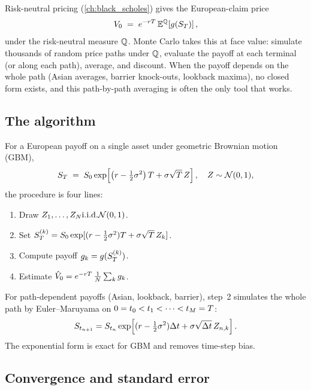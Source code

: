 Risk-neutral pricing (\cref{ch:black_scholes}) gives the European-claim
price
\begin{equation}
\label{eq:rn_pricing}
  V_0 \;=\; e^{-r T}\, \mathbb{E}^{\mathbb{Q}}\!\left[ g(S_T) \right],
\end{equation}
under the risk-neutral measure $\mathbb{Q}$.  Monte Carlo takes this at
face value: simulate thousands of random price paths under $\mathbb{Q}$,
evaluate the payoff at each terminal (or along each path), average,
and discount.  When the payoff depends on the whole path (Asian
averages, barrier knock-outs, lookback maxima), no closed form
exists, and this path-by-path averaging is often the only tool that
works.

\subsection{The algorithm}

For a European payoff on a single asset under geometric Brownian
motion (GBM),
\begin{equation}
  S_T \;=\; S_0 \exp\!\left[
    \left(r - \tfrac12 \sigma^2\right)T
    + \sigma \sqrt{T}\, Z \right],
  \quad Z \sim \mathcal{N}(0,1),
\end{equation}
the procedure is four lines:
\begin{enumerate}
  \item Draw $Z_1, \ldots, Z_N \text{i.i.d.} \mathcal{N}(0,1)$.
  \item Set $S_T^{(k)} = S_0 \exp[(r - \tfrac12\sigma^2)T + \sigma\sqrt{T}\,Z_k]$.
  \item Compute payoff $g_k = g(S_T^{(k)})$.
  \item Estimate $\hat V_0 = e^{-rT}\, \tfrac1N \sum_k g_k$.
\end{enumerate}

For path-dependent payoffs (Asian, lookback, barrier), step~2
simulates the whole path by Euler--Maruyama on $0 = t_0 < t_1 < \cdots
< t_M = T$:
\begin{equation}
  S_{t_{n+1}} = S_{t_n} \exp\!\left[
    (r - \tfrac12 \sigma^2)\Delta t + \sigma\sqrt{\Delta t}\, Z_{n,k}
  \right].
\end{equation}
The exponential form is exact for GBM and removes time-step bias.

\subsection{Convergence and standard error}

